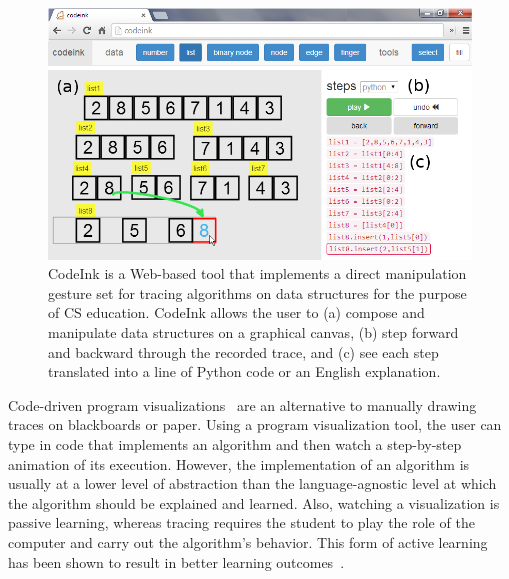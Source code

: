 \begin{figure}

\begin{center}
\includegraphics[width=\columnwidth]{img/frontpage-mergesort.png}
\end{center}

\caption{CodeInk is a Web-based tool that implements a direct
manipulation gesture set for tracing algorithms on data structures for the
purpose of CS education. CodeInk allows the user to (a) compose and
manipulate data structures on a graphical canvas, (b) step forward and
backward through the recorded trace, and (c) see each step translated
into a line of Python code or an English explanation.}


\label{fig:codeink-intro}
\end{figure}

Code-driven program visualizations~\cite{Sorva2013} are an alternative
to manually drawing traces on blackboards or paper. Using a program
visualization tool, the user can type in code that implements an
algorithm and then watch a step-by-step animation of its execution.
However, the implementation of an algorithm is usually at a lower
level of abstraction than the language-agnostic level at which the
algorithm should be explained and learned. Also, watching a
visualization is passive learning, whereas tracing requires the student
to play the role of the computer and carry out the algorithm's behavior.
This form of active learning has been shown to result in better learning
outcomes~\cite{Sorva2012Diss}.

